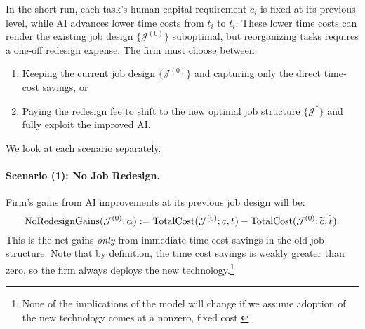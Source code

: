 \documentclass{article}
\theoremstyle{plain}
\theoremstyle{plain}
\begin{document}
In the short run, each task’s human‐capital requirement \(c_{i}\) is fixed at its previous level, while AI advances lower time costs from \(t_{i}\) to \(\widetilde t_{i}\).  
These lower time costs can render the existing job design \(\{\mathcal{J}^{(0)}\}\) suboptimal, but reorganizing tasks requires a one‐off redesign expense.  
The firm must choose between:  
\begin{enumerate}
  \item Keeping the current job design \(\{\mathcal{J}^{(0)}\}\) and capturing only the direct time‐cost savings, or  
  \item Paying the redesign fee to shift to the new optimal job structure \(\{\mathcal{J}^*\}\) and fully exploit the improved AI.
\end{enumerate}
We look at each scenario separately.

\paragraph{Scenario (1): No Job Redesign.}
Firm's gains from AI improvements at its previous job design will be:
\begin{equation}
\label{eq:no_redesign_gains}
\text{NoRedesignGains}(\mathcal{J}^{(0)}, \alpha)
:=
\text{TotalCost}(\mathcal{J}^{(0)}; c_{}, t_{}) - \text{TotalCost}(\mathcal{J}^{(0)}; \widetilde{c_{}}, \widetilde{t_{}}).
\end{equation}
This is the net gains \emph{only} from immediate time cost savings in the old job structure.
Note that by definition, the time cost savings is weakly greater than zero, so the firm always deploys the new technology.\footnote{None of the implications of the model will change if we assume adoption of the new technology comes at a nonzero, fixed cost.}
\end{document}
